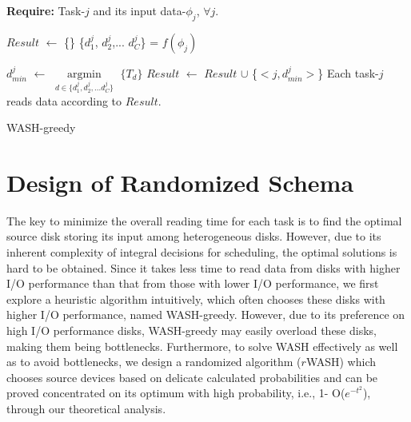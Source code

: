\documentclass[conference]{IEEEtran}
\begin{document}



\begin{algorithm}[!t]

	\textbf{Require:} Task-$j$ and its input data-$\phi_j$, $\forall j$.

	\begin{algorithmic}[1]
		
		\State $Result$ $\gets$ \{\}\label{WASH-greedy:init}
			\State \{$d_{1}^j$, $d_{2}^j$,... $d_{C}^j$\} = $f(\phi_j)$
		
	
			\State $d_{min}^j$ $\gets$ $\mathop{\arg\min}\limits_{d \in \{d_{1}^j, d_{2}^j,... d_{C}^j\}}$ $\{T_d\}$
			\State $Result$ $\gets$ $Result$ $\cup$
			\{$< j, d_{min}^j>$\}
		\EndFor
	\State  Each task-$j$ reads data according to $Result$.
	\end{algorithmic}
	\caption{WASH-greedy}\label{WASH-greedy}
\end{algorithm}

\section{Design of Randomized Schema}\label{DESIGN_ALGORITHM}

The key to minimize the overall reading time for each task is to find the optimal source disk storing its input among heterogeneous disks. However, due to its inherent complexity of integral decisions for scheduling, the optimal solutions is hard to be obtained. Since it takes less time to read data from disks with higher I/O performance than that from those with lower I/O performance, we first explore a heuristic algorithm intuitively, which often chooses these disks with higher I/O performance, named WASH-greedy. However, due to its preference on high I/O performance disks, WASH-greedy may easily overload these disks, making them being bottlenecks. 
Furthermore, to solve WASH effectively as well as to avoid bottlenecks, we design a randomized algorithm ($r$WASH) which chooses source devices based on delicate calculated probabilities and can be proved concentrated on its optimum with high probability, i.e., 1- O($e^{-t^2}$), through our theoretical analysis.
\end{document}
